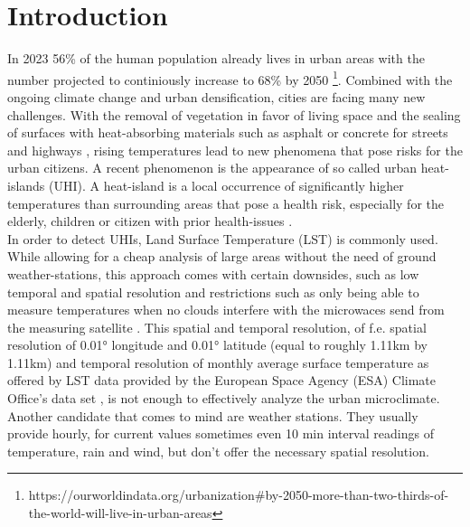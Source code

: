 
\chapter{Introduction}

 In 2023 56\% of the human population already lives in urban areas with the number projected to continiously increase to 68\% by 2050 \footnote{https://ourworldindata.org/urbanization\#by-2050-more-than-two-thirds-of-the-world-will-live-in-urban-areas}. Combined with the ongoing climate change and urban densification, cities are facing many new challenges. With the removal of vegetation in favor of living space and the sealing of surfaces with heat-absorbing materials such as asphalt or concrete for streets and highways \cite{gret2020urban}, rising temperatures lead to new phenomena that pose risks for the urban citizens. A recent phenomenon is the appearance of so called urban heat-islands (UHI). A heat-island is a local occurrence of significantly higher temperatures than surrounding areas that pose a health risk, especially for the elderly, children or citizen with prior health-issues \cite{martin2015alternative}.\\
In order to detect UHIs, Land Surface Temperature (LST) is commonly used. While allowing for a cheap analysis of large areas without the need of ground weather-stations, this approach comes with certain downsides, such as low temporal and spatial resolution and restrictions such as only being able to measure temperatures when no clouds interfere with the microwaces send from the measuring satellite \cite{zhang2015estimation}. This spatial and temporal resolution, of f.e. spatial resolution of 0.01° longitude and 0.01° latitude (equal to roughly 1.11km by 1.11km) and temporal resolution of monthly average surface temperature as offered by LST data provided by the European Space Agency (ESA) Climate Office's data set \cite{ghent2022esalst}, is not enough to effectively analyze the urban microclimate. Another candidate that comes to mind are weather stations. They usually provide hourly, for current values sometimes even 10 min interval readings of temperature, rain and wind, but don't offer the necessary spatial resolution.
